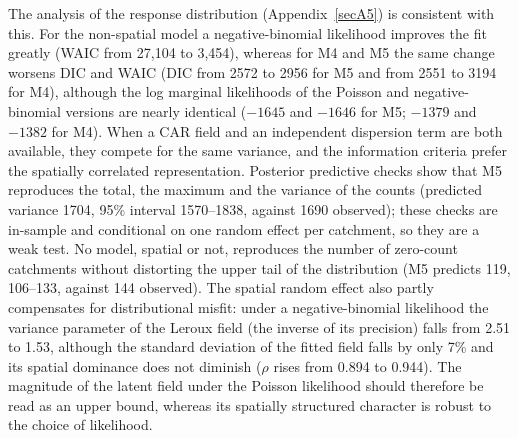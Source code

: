 \documentclass[journal abbreviation, manuscript]{copernicus}
\newcommand{\hlE}[1]{#1}
\begin{document}
\hlE{The analysis of the response distribution (\mbox{Appendix~\ref{secA5}}) is consistent with this. For the non-spatial model a negative-binomial likelihood improves the fit greatly (WAIC from 27,104 to 3,454), whereas for M4 and M5 the same change worsens DIC and WAIC (DIC from 2572 to 2956 for M5 and from 2551 to 3194 for M4), although the log marginal likelihoods of the Poisson and negative-binomial versions are nearly identical ($-1645$ and $-1646$ for M5; $-1379$ and $-1382$ for M4). When a CAR field and an independent dispersion term are both available, they compete for the same variance, and the information criteria prefer the spatially correlated representation. Posterior predictive checks show that M5 reproduces the total, the maximum and the variance of the counts (predicted variance 1704, 95\% interval 1570--1838, against 1690 observed); these checks are in-sample and conditional on one random effect per catchment, so they are a weak test. No model, spatial or not, reproduces the number of zero-count catchments without distorting the upper tail of the distribution (M5 predicts 119, 106--133, against 144 observed). The spatial random effect also partly compensates for distributional misfit: under a negative-binomial likelihood the variance parameter of the Leroux field (the inverse of its precision) falls from 2.51 to 1.53, although the standard deviation of the fitted field falls by only 7\% and its spatial dominance does not diminish ($\rho$ rises from 0.894 to 0.944). The magnitude of the latent field under the Poisson likelihood should therefore be read as an upper bound, whereas its spatially structured character is robust to the choice of likelihood.}
\end{document}
